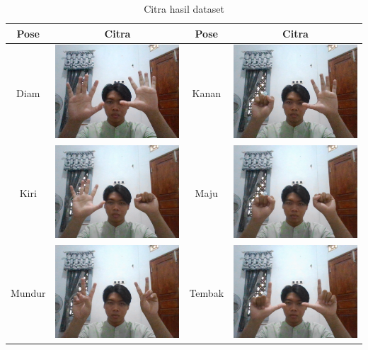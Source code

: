 \begin{table}[H]
  \centering
  \caption{Citra hasil dataset}
  \label{tab:citradaset}
  \begin{tabular}{|c|c|c|c|}
  \hline
  Pose   & Citra & Pose   & Citra \\ \hline
  Diam   & \includegraphics[width=0.3\linewidth]{../Gambar/posediam.png} &
  Kanan  & \includegraphics[width=0.3\linewidth]{../Gambar/posekanan.png} \\ \hline
  Kiri   & \includegraphics[width=0.3\linewidth]{../Gambar/posekiri.png} &
  Maju   & \includegraphics[width=0.3\linewidth]{../Gambar/posemaju.png} \\ \hline
  Mundur & \includegraphics[width=0.3\linewidth]{../Gambar/posemundur.png} &
  Tembak & \includegraphics[width=0.3\linewidth]{../Gambar/posetembak.png} \\ \hline
\end{tabular}
\end{table}

